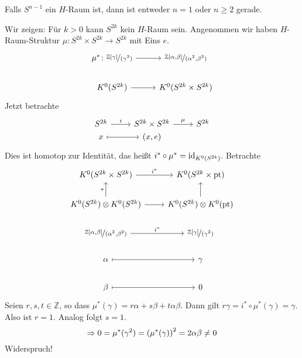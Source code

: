 \begin{satz}[label=sub:44]
Falls $S^{n-1}$ ein $H$-Raum ist, dann ist entweder $n=1$ oder $n\ge 2$ gerade.	
\end{satz}
\begin{beweis}
Wir zeigen: Für $k>0$ kann $S^{2k}$ kein $H$-Raum sein. Angenommen wir haben $H$-Raum-Struktur $\mu \colon S^{2k} \times S^{2k} \to S^{2k}$ mit Eins $e$. 
\[
	\begin{tikzcd}
		\mu^* \colon \nicefrac{\mathds{Z}[\gamma]}{(\gamma^2)} \rar & \nicefrac{\mathds{Z}[\alpha,\beta]}{(\alpha^2,\beta^2)} \\
		K^0(S^{2k}) \rar & K^0(S^{2k} \times S^{2k})
	\end{tikzcd}
\]
Jetzt betrachte
\[
	\begin{tikzcd}[row sep=0cm]
		S^{2k} \rar["i"] & S^{2k} \times S^{2k} \rar["\mu"] & S^{2k} \\
		x \rar[mapsto] & (x,e)
	\end{tikzcd}
\]
Dies ist homotop zur Identität, das heißt $i^* \circ \mu^* = \id_{K^0(S^{2k})}$. Betrachte
\[
	\begin{tikzcd}
		K^0(S^{2k} \times S^{2k}) \rar["i^*"] & K^0(S^{2k}\times \pt) \\
		K^0(S^{2k}) \otimes K^0(S^{2k}) \uar["*"] \rar & K^0(S^{2k}) \otimes K^0(\pt) \uar \\
		\nicefrac{\mathds{Z}[\alpha,\beta]}{(\alpha^2,\beta^2)} \rar["i^*"] & \nicefrac{\mathds{Z}[\gamma]}{(\gamma^2)} \\
		\alpha \rar[mapsto] & \gamma \\
		\beta \rar[mapsto] & 0
	\end{tikzcd}
\]
Seien $r,s,t \in \mathds{Z}$, so dass $\mu^*(\gamma)= r \alpha + s \beta+ t \alpha \beta$. Dann gilt $r \gamma = i^* \circ \mu^*(\gamma)=\gamma$. Also ist $r=1$. Analog folgt
$s=1$.
\[
	\Rightarrow 0 = \mu^*(\gamma^2) = \enbrace*{\mu^*(\gamma)}^2 = 2 \alpha \beta \not=0  
\]
Widerspruch!	
\end{beweis}


